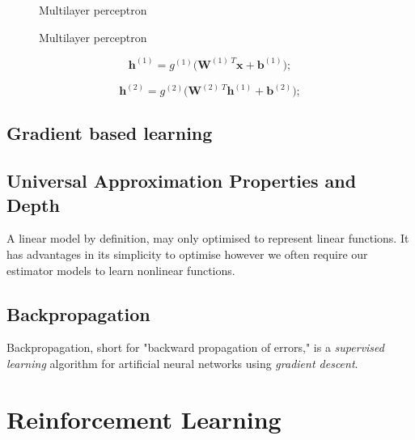 \begin{figure}
    \centering
    
    \caption{Multilayer perceptron}
    \label{fig:mlp}
\end{figure}


\begin{figure}
    \centering
    
    \caption{Multilayer perceptron}
    \label{fig:mlp-vec}
\end{figure}


\begin{equation}
    \mathbf{h}^{(1)} = g^{(1)} \bigg(\mathbf{W}^{{(1)}\;T}\mathbf{x} + \mathbf{b}^{(1)}\bigg);
\end{equation}

\begin{equation}
    \mathbf{h}^{(2)} = g^{(2)} \bigg(\mathbf{W}^{{(2)}\;T}\mathbf{h}^{(1)} + \mathbf{b}^{(2)}\bigg);
\end{equation}

\subsection{Gradient based learning}

\subsection{Universal Approximation Properties and Depth}

A linear model by definition, may only optimised to represent linear functions.
It has advantages in its simplicity to optimise however we often require our
estimator models to learn nonlinear functions.

\subsection{Backpropagation}

Backpropagation, short for "backward propagation of errors," is a
\textit{supervised learning} algorithm for artificial neural networks using
\textit{gradient descent}.


\section{Reinforcement Learning\label{ssec:RL}}

